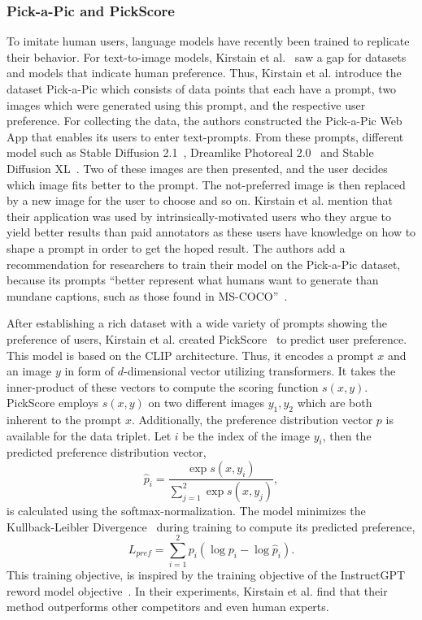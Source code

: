 \subsubsection{Pick-a-Pic and PickScore}
\label{sec:wuerstchen:PickScore}
To imitate human users, language models have recently been trained to replicate
their behavior. For text-to-image models, Kirstain et
al.~\cite{kirstain2023pickapic} saw a gap for datasets and models that
indicate human preference. Thus, Kirstain et al. introduce the dataset
Pick-a-Pic which consists of data points that each have a prompt, two images which
were generated using this prompt, and the respective user preference. For
collecting the data, the authors constructed the Pick-a-Pic Web App that enables
its users to enter text-prompts. From these prompts, different model such as
Stable Diffusion 2.1~\cite{rombach2023sd_2_1}, Dreamlike Photoreal 2.0~\cite{dreamlike_art2024} and
Stable Diffusion XL~\cite{podell2024sdxl}. Two of these images are then
presented, and the user decides which image fits better to the prompt. The
not-preferred image is then replaced by a new image for the user to choose and so on. Kirstain et al.
mention that their application was used by intrinsically-motivated users who
they argue to yield better results than paid annotators as these users have
knowledge on how to shape a prompt in order to get the hoped result. The authors
add a recommendation for researchers to train their model on the Pick-a-Pic
dataset, because its prompts ``better represent what humans want to generate
than mundane captions, such as those found in MS-COCO''~\cite{kirstain2023pickapic}.

After establishing a rich dataset with a wide variety of prompts showing the
preference of users, Kirstain et al. created PickScore~\cite{kirstain2023pickapic}
to predict user preference. This model is based on the CLIP architecture. Thus,
it encodes a prompt $x$ and an image $y$ in form of $d$-dimensional
vector utilizing transformers. It takes the inner-product of these vectors to compute the scoring function
$s(x, y)$. PickScore employs $s(x, y)$ on two different images $y_1, y_2$ which
are both inherent to the prompt $x$. Additionally, the preference distribution
vector $p$ is available for the data triplet. Let $i$ be the index of the image
$y_i$, then the predicted preference distribution vector,
\begin{equation}
    \hat{p}_i = \frac{\exp s(x, y_i)}{\sum_{j=1}^{2}\exp s(x, y_j)},
\end{equation}
is calculated using the softmax-normalization. The model minimizes the
Kullback-Leibler Divergence~\cite{kullback1951OnInformationandSufficiency} during training to compute its predicted preference,
\begin{equation}
    L_{pref} = \sum_{i=1}^{2} p_i (\log p_i - \log\hat{p}_i).
\end{equation}
This training objective, is inspired
by the training objective of the InstructGPT reword model
objective~\cite{Ouyang2024InstructGPT}. In their experiments, Kirstain et al.
find that their method outperforms other competitors and even human experts.

